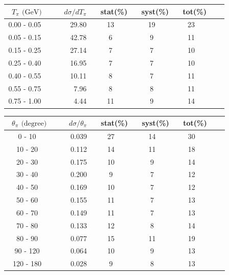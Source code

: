 \documentclass[aps, prd, reprint,showpacs,  preprintnumbers,amsmath,amssymb,superscriptaddress, nofootinbib]{revtex4-1}
\makeatletter
\renewenvironment{table}
  {\def\@captype{table}}
  {}
\makeatother
\begin{document}
\begin{table}
\centering
\begin{tabular}{crccccc}
\hline
~$T_{\pi}$ $\text{(GeV)}$ &~~~ $d\sigma/dT_{\pi}$ &~ stat(\%) &~ syst(\%) &~ tot(\%)  \\
\hline
   0.00 - 0.05 &  29.80 &   13 &   19 &   23 \\
   0.05 - 0.15 &  42.78 &    6 &    9 &   11 \\
   0.15 - 0.25 &  27.14 &    7 &    7 &   10 \\
   0.25 - 0.40 &  16.95 &    7 &    7 &   10 \\
   0.40 - 0.55 &  10.11 &    8 &    7 &   11 \\
   0.55 - 0.75 &   7.96 &    8 &    8 &   11 \\
   0.75 - 1.00 &   4.44 &   11 &    9 &   14 \\
\hline\hline
\end{tabular}
\caption{ Flux-averaged differential cross section in $T_{\pi}$, 
$d\sigma/dT_{\pi} (10^{-40}\text{cm}^2/\text{nucleon}/\text{GeV})$, 
for $\pi^0$+nucleon(s) production with statistical (stat), systematic (syst), and total (tot) uncertainties.}
\label{tb:pi0-kinetic-energy}
\end{table}
\vspace{0.4cm}

\begin{table}
\centering
\begin{tabular}{crccccc}
\hline
~$\theta_\pi$ $\text{(degree)}$ &~~~ $d\sigma/\theta_\pi$ &~ stat(\%) &~ syst(\%) &~ tot(\%)  \\
\hline
        0 - 10 &  0.039 &   27 &   14 &   30 \\
       10 - 20 &  0.112 &   14 &   11 &   18 \\
       20 - 30 &  0.175 &   10 &    9 &   14 \\
       30 - 40 &  0.200 &    9 &    7 &   12 \\
       40 - 50 &  0.169 &   10 &    7 &   12 \\
       50 - 60 &  0.155 &   11 &    7 &   13 \\
       60 - 70 &  0.149 &   11 &    7 &   13 \\
       70 - 80 &  0.133 &   12 &    8 &   14 \\
       80 - 90 &  0.077 &   15 &   11 &   19 \\
      90 - 120 &  0.064 &   10 &    9 &   13 \\
     120 - 180 &  0.028 &    9 &    8 &   13 \\
\hline\hline
\end{tabular}
\caption{ Flux-averaged differential cross section in $\theta_\pi$, 
$d\sigma/d\theta_{\pi} (10^{-40}\text{cm}^2/\text{nucleon}/\text{degree})$, 
for $\pi^0$+nucleon(s) production with statistical (stat), systematic (syst), and total (tot) uncertainties.}
\label{tb:pi0-theta}
\end{table}
\vspace{0.4cm}
\end{document}
